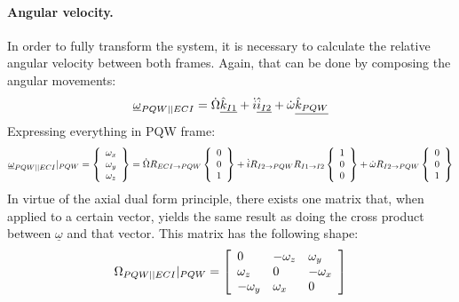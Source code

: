 			\paragraph{Angular velocity. \\}
			\indent In order to fully transform the system, it is necessary to calculate the relative angular velocity between both frames. Again, that can be done by composing the angular movements:
			\[
			\underline{\omega}_{PQW \vert \vert ECI} = \dot{\Omega} \underline{\hat{k}_{I1}} + \dot{i} \underline{\hat{i}_{I2}} + \dot{\omega} \underline{\hat{k}_{PQW}}
			\]
			\indent Expressing everything in PQW frame:
			\[
			\underline{\omega}_{PQW \vert \vert ECI}\rvert_{PQW} = \left\{\begin{array}{c} \omega_x \\ \omega_y \\ \omega_z \end{array}\right\} = \dot{\Omega} R_{ECI\rightarrow PQW} \left\{\begin{array}{c} 0 \\ 0 \\ 1 \end{array}\right\} + \dot{i} R_{I2 \rightarrow PQW}R_{I1 \rightarrow I2} \left\{\begin{array}{c} 1 \\ 0 \\ 0 \end{array}\right\} + \dot{\omega} R_{I2 \rightarrow PQW} \left\{\begin{array}{c} 0 \\ 0 \\ 1 \end{array}\right\}
			\]
			\indent In virtue of the axial dual form principle, there exists one matrix that, when applied to a certain vector, yields the same result as doing the cross product between $\underline{\omega}$ and that vector. This matrix has the following shape:
			\[
			\Omega_{PQW \vert \vert ECI}\rvert_{PQW} = \left[ \begin{array}{lll}
			0 			& -\omega_z & \omega_y \\
			\omega_z 	& 0 		& -\omega_x \\
			-\omega_y 	& \omega_x 	& 0
			\end{array}\right]
			\]
